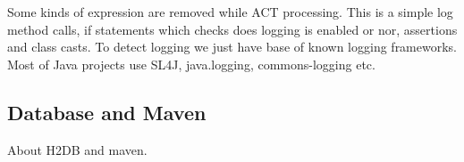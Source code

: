 Some kinds of expression are removed while ACT processing. This is a simple
log method calls, if statements which checks does logging is enabled or nor,
assertions and class casts. To detect logging we just have base of known logging
frameworks. Most of Java projects use SL4J, java.logging, commons-logging etc.

\subsection{Database and Maven}

About H2DB and maven.